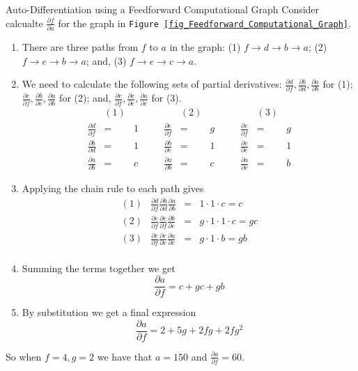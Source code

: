 \documentclass[11pt,a4paper]{article}
\begin{document}
  \begin{example}{Auto-Differentiation using a Feedforward Computational Graph}
    Consider calcualte $\frac{\partial f}{\partial a}$ for the graph in  \texttt{Figure \ref{fig_Feedforward_Computational_Graph}}.
    \begin{enumerate}
      \item There are three paths from $f$ to $a$ in the graph: (1) $f\to d\to b\to a$; (2) $f\to e\to b\to a$; and, (3) $f\to e\to c\to a$.
      \item We need to calculate the following sets of partial derivatives: $\frac{\partial d}{\partial f},\frac{\partial b}{\partial d},\frac{\partial a}{\partial b}$ for (1); $\frac{\partial e}{\partial f},\frac{\partial b}{\partial e},\frac{\partial a}{\partial b}$ for (2); and, $\frac{\partial e}{\partial f},\frac{\partial c}{\partial e},\frac{\partial a}{\partial c}$ for (3).
      \[\begin{array}{rclcrclcrcl}
        &(1)&&&&(2)&&&&(3)\\
        \frac{\partial d}{\partial f}&=&1&\quad&\frac{\partial e}{\partial f}&=&g&\quad&\frac{\partial e}{\partial f}&=&g\\
        \frac{\partial b}{\partial d}&=&1&\quad&\frac{\partial b}{\partial e}&=&1&\quad&\frac{\partial c}{\partial e}&=&1\\
        \frac{\partial a}{\partial b}&=&c&\quad&\frac{\partial a}{\partial b}&=&c&\quad&\frac{\partial a}{\partial c}&=&b
      \end{array}\]
      \item Applying the chain rule to each path gives
      \[\begin{array}{rrcl}
        (1)&\frac{\partial d}{\partial f}\frac{\partial b}{\partial d}\frac{\partial a}{\partial b}&=&1\cdot1\cdot c=c\\
        (2)&\frac{\partial e}{\partial f}\frac{\partial e}{\partial f}\frac{\partial b}{\partial e}&=&g\cdot1\cdot1\cdot c=gc\\
        (3)&\frac{\partial e}{\partial f}\frac{\partial c}{\partial e}\frac{\partial a}{\partial c}&=&g\cdot1\cdot b=gb\\
      \end{array}\]
      \item Summing the terms together we get
      \[ \frac{\partial a}{\partial f}=c+gc+gb \]
      \item By substitution we get a final expression
      \[ \frac{\partial a}{\partial f}=2+5g+2fg+2fg^2 \]
    \end{enumerate}
    So when $f=4,g=2$ we have that $a=150$ and $\frac{\partial a}{\partial f}=60$.
  \end{example}
\end{document}
